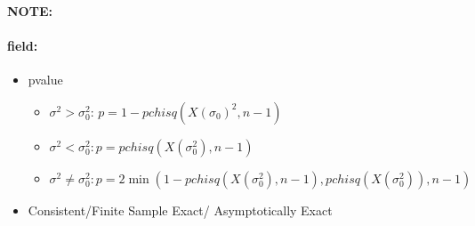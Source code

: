 \documentclass[12pt]{article}
\newenvironment{note}{\paragraph{NOTE:}}{}
\newenvironment{field}{\paragraph{field:}}{}
\begin{document}
\begin{note}
\begin{field}
\begin{itemize}
   \item pvalue
         \begin{itemize}
          \item $\sigma^2 > \sigma_0^2$: $p = 1 - pchisq(X(\sigma_0)^2,n-1)$
          \item $\sigma^2 < \sigma_0^2: p = pchisq(X(\sigma_0^2),n-1)$
          \item $\sigma^2 \neq \sigma_0^2: p = 2\min(1 - pchisq(X(\sigma_0^2), n-1), pchisq(X(\sigma_0^2)),n-1)$
         \end{itemize}
   \item Consistent/Finite Sample Exact/ Asymptotically Exact
  \end{itemize}
 \end{field}
\end{note}
\end{document}
